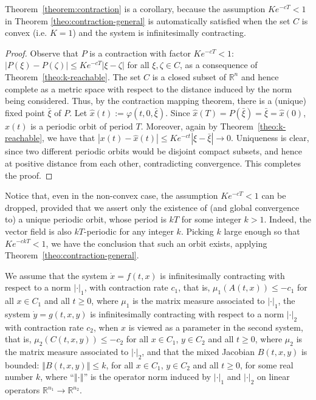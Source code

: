 \documentclass{svmult}
\newcommand{\mysubsection}[1]{\smallskip\noindent{\bf \emph{#1}.}}
\newcommand{\R}{{\mathbb R}}  %
\newcommand{\abs}[1]{\left\vert #1 \right\vert}
\newcommand{\norm}[1]{\left\Vert #1 \right\Vert}
\newcommand{\cc}{c}
\newcommand{\kk}{k}
\newcommand{\cckT}{ckT}
\newcommand{\norma}{1}
\newcommand{\normb}{2}
\newcommand{\perorb}{\hat{x}}
\begin{document}
Theorem~\ref{theorem:contraction} is a corollary, because the assumption
$Ke^{-\cc T}<1$ in Theorem \ref{theo:contraction-general} is automatically
satisfied when the set $C$ is convex (i.e. $K=1$) and the system is
infinitesimally contracting.


\begin{proof}
Observe that $P$ is a contraction with factor $Ke^{-\cc T}<1$: 
$\abs{P(\xi )-P(\zeta )}\leq Ke^{-\cc T} \abs{\xi -\zeta }$
for all $\xi ,\zeta \in C$,
as a consequence of Theorem~\ref{theo:k-reachable}.
The set $C$ is a closed subset of $\R^n$ and hence complete as a metric space
with respect to the distance induced by the norm being considered.
Thus, by the contraction mapping theorem, there is a (unique) fixed
point $\bar \xi $ of $P$.
Let $\perorb(t):=\varphi(t,0,\bar \xi )$.
Since $\perorb(T)=P(\bar \xi )={\bar \xi }=\perorb(0)$, $\perorb(t)$ is a periodic orbit of
period $T$. 
Moreover, again by Theorem~\ref{theo:k-reachable},
we have that
$\abs{x(t)-\perorb(t)} \leq  K e^{-\cc t} \abs{\xi -\bar \xi }\rightarrow 0$.
Uniqueness is clear, since two different periodic orbits would be disjoint
compact subsets, and hence at positive distance from each other,
contradicting convergence. This completes the proof.
\end{proof}

Notice that, even in the non-convex case, the assumption $Ke^{-\cc T}<1$ can be
dropped, provided that we assert only the existence of (and global
convergence to) a unique periodic orbit, whose period is $kT$ for some integer
$k>1$.  Indeed, the vector field is also $kT$-periodic for any integer $k$.
Picking $k$ large enough so that $Ke^{-\cckT}<1$, we have the conclusion that
such an orbit exists, applying Theorem~\ref{theo:contraction-general}.

\mysubsection{Proof of Theorem~\protect{\ref{theo:cascades}}}
We assume that the system $\dot x=f(t,x)$ is infinitesimally contracting with
respect to a norm $\abs{\cdot }_\norma$, with contraction rate $\cc_1$, that is,
$\mu _\norma(A(t,x))\leq  -\cc_1$ for all $x\in C_1$ and all $t\geq 0$, where
$\mu _\norma$ is the matrix measure associated to $\abs{\cdot }_\norma$,
the system $\dot y=g(t,x,y)$ is infinitesimally contracting with respect to a
norm $\abs{\cdot }_{\normb}$ with contraction rate $\cc_2$, when $x$ is viewed as
a parameter in the second system, that is, $\mu _{\normb}(C(t,x,y))\leq  -\cc_2$
for all $x\in C_1$, $y\in C_2$ and all $t\geq 0$, where $\mu _{\normb}$ is
the matrix measure associated to $\abs{\cdot }_{\normb}$,
and that the mixed Jacobian $B(t,x,y)$ is bounded:
$\norm{B(t,x,y)}\leq \kk$, for all $x\in C_1$, $y\in C_2$ and all $t\geq 0$,
for some real number $k$, where ``$\norm{\cdot }$'' is the
operator norm induced by $\abs{\cdot }_{\norma}$ and $\abs{\cdot }_{\normb}$ on
linear operators $\R^{n_1} \rightarrow  \R^{n_2}$.
\end{document}

